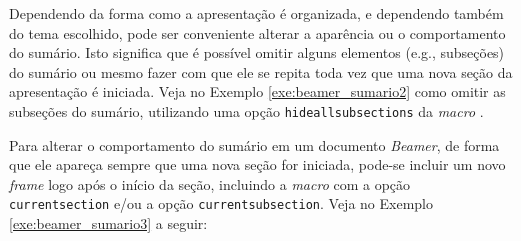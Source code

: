 Dependendo da forma como a apresentação é organizada, e dependendo também do tema escolhido, pode ser conveniente alterar a aparência ou o comportamento do sumário. Isto significa que é possível omitir alguns elementos (e.g., subseções) do sumário ou mesmo fazer com que ele se repita toda vez que uma nova seção da apresentação é iniciada. Veja no Exemplo \ref{exe:beamer_sumario2} como omitir as subseções do sumário, utilizando uma opção {\tt hideallsubsections} da \textit{macro} \texttt{\tableofcontents}.


Para alterar o comportamento do sumário em um documento \textit{Beamer}, de forma que ele apareça sempre que uma nova seção for iniciada, pode-se incluir um novo \textit{frame} logo após o início da seção, incluindo a \textit{macro} \texttt{\tableofcontents} com a opção {\tt currentsection} e/ou a opção {\tt currentsubsection}. Veja no Exemplo \ref{exe:beamer_sumario3} a seguir:

